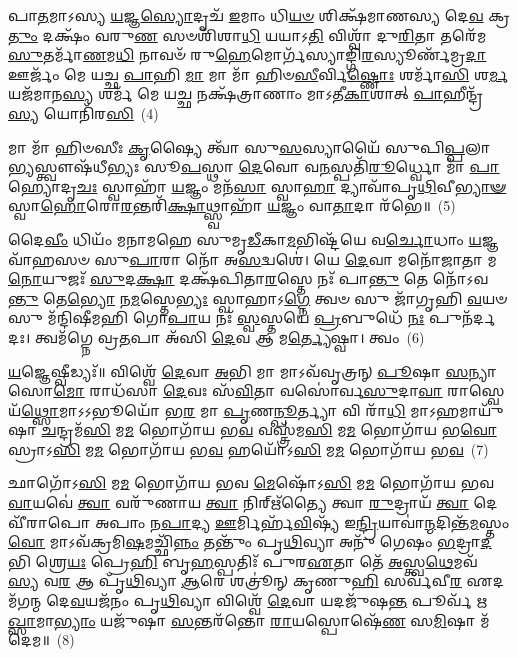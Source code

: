 𑌪𑌾\-\ul{𑌤}\-𑌮𑌾\-𑌽𑌸𑍍𑌯 \ul{𑌯}\-𑌜𑍍𑌞\-\ul{𑌸𑍍𑌯𑍋}\-𑌦𑍃𑌚᳴ \ul{𑌇}\-𑌮𑌾𑌂 𑌧𑌿\-\ul{𑌯}\-\-\ul{𑍞} 𑌶𑌿𑌕𑍍𑌷᳴𑌮𑌾𑌣𑌸𑍍𑌯 𑌦𑍇\-\ul{𑌵} 𑌕𑍍𑌰\-\ul{𑌤𑍁𑌂} 𑌦𑌕𑍍𑌷𑌂᳴ 𑌵𑌰𑍁\-\ul{𑌣} 𑌸𑍞𑌶𑌿᳴𑌶𑌾\-\ul{𑌧𑌿} 𑌯𑌯𑌾\-𑌽\-\ul{𑌤𑌿} 𑌵𑌿𑌶𑍍𑌵𑌾᳴ 𑌦𑍁\-\ul{𑌰𑌿}\-𑌤𑌾 𑌤𑌰𑍇᳴𑌮 \ul{𑌸𑍁}\-𑌤𑌰𑍍𑌮𑌾᳴\-\ul{𑌣}\-𑌮\-\ul{𑌧𑌿} 𑌨𑌾𑌵𑍞᳴ 𑌰𑍁\-\ul{𑌹𑍇}\-𑌮𑍋𑌰𑍍𑌗᳴𑌸𑍍𑌯𑌾𑌙𑍍𑌗𑌿\-\ul{𑌰}\-𑌸𑍍𑌯𑍂𑌰𑍍𑌣᳴𑌮𑍍𑌰\-\ul{𑌦𑌾} 𑌊𑌰𑍍𑌜𑌂᳴ 𑌮𑍇 𑌯𑌚𑍍𑌛 \ul{𑌪𑌾}\-𑌹𑌿 \ul{𑌮𑌾} 𑌮𑌾 𑌮𑌾᳴ 𑌹𑌿𑍞\-\ul{𑌸𑍀}\-𑌰𑍍𑌵𑌿\-\ul{𑌷𑍍𑌣𑍋𑌃} 𑌶𑌰𑍍𑌮𑌾᳴\-\ul{𑌸𑌿} 𑌶\-\ul{𑌰𑍍𑌮} 𑌯𑌜᳴𑌮𑌾𑌨\-\ul{𑌸𑍍𑌯} 𑌶𑌰𑍍𑌮᳴ 𑌮𑍇 𑌯\-\ul{𑌚𑍍𑌛} 𑌨𑌕𑍍𑌷᳴𑌤𑍍𑌰𑌾𑌣𑌾𑌂 𑌮𑌾\-𑌽𑌤𑍀\-\ul{𑌕𑌾}\-𑌶𑌾𑌤𑍍 \ul{𑌪𑌾}\-𑌹𑍀𑌨𑍍𑌦𑍍𑌰᳴\-\ul{𑌸𑍍𑌯} 𑌯𑍋𑌨𑌿᳴𑌰\-\ul{𑌸𑌿}\-~(4)

𑌮𑌾 𑌮𑌾᳴ 𑌹𑌿𑍞𑌸𑍀𑌃 \ul{𑌕𑍃}\-𑌷𑍍𑌯𑍈 𑌤𑍍𑌵𑌾᳴ 𑌸𑍁\-\ul{𑌸}\-𑌸𑍍𑌯𑌾𑌯𑍈᳴ 𑌸𑍁𑌪𑌿\-\ul{𑌪𑍍𑌪}\-𑌲𑌾\-\ul{𑌭𑍍𑌯}\-𑌸𑍍𑌤𑍍𑌵𑍗𑌷᳴\-𑌧𑍀𑌭𑍍𑌯𑌃 𑌸𑍂\-\ul{𑌪}\-𑌸𑍍𑌥𑌾 \ul{𑌦𑍇}\-𑌵𑍋 𑌵\-\ul{𑌨}\-𑌸𑍍𑌪𑌤𑌿᳴\-\ul{𑌰𑍂}\-𑌰𑍍𑌧𑍍𑌵𑍋 𑌮𑌾᳴ \ul{𑌪𑌾}\-𑌹𑍍𑌯𑍋𑌦𑍃\-\ul{𑌚𑌃} 𑌸𑍍𑌵𑌾𑌹𑌾᳴ \ul{𑌯}\-𑌜𑍍𑌞𑌂 𑌮𑌨᳴\-\ul{𑌸𑌾} 𑌸𑍍𑌵𑌾\-\ul{𑌹𑌾} 𑌦𑍍𑌯𑌾𑌵𑌾᳴𑌪𑍃\-\ul{𑌥𑌿}\-𑌵𑍀\-\ul{𑌭𑍍𑌯𑌾}\-\-\ul{𑍟} 𑌸𑍍𑌵𑌾\-\ul{𑌹𑍋}\-𑌰𑍋\-\ul{𑌰}\-𑌨𑍍𑌤𑌰𑌿᳴\-\ul{𑌕𑍍𑌷𑌾}\-𑌥𑍍𑌸𑍍𑌵𑌾𑌹𑌾᳴ \ul{𑌯}\-𑌜𑍍𑌞𑌂 𑌵𑌾\-\ul{𑌤𑌾}\-𑌦𑌾 𑌰᳴𑌭𑍇॥~(5)

{\anuvakamend[{\-\ul{𑌮𑌾} 𑌯𑍋𑌨𑌿᳴𑌰𑌸𑌿 \ul{𑌤𑍍𑌰𑌿}\-\-\ul{𑍞}\-𑌶𑌚𑍍𑌚᳴}]}%

𑌦𑍈\-\ul{𑌵𑍀𑌂} 𑌧𑌿𑌯𑌂᳴ 𑌮𑌨𑌾𑌮𑌹𑍇 𑌸𑍁𑌮𑍃\-\ul{𑌡𑍀}\-𑌕𑌾\-\ul{𑌮}\-𑌭𑌿𑌷𑍍𑌟᳴𑌯𑍇 𑌵\-\ul{𑌰𑍍𑌚𑍋}\-𑌧𑌾𑌂 \ul{𑌯}\-𑌜𑍍𑌞𑌵𑌾᳴𑌹𑌸𑍞 𑌸𑍁\-\ul{𑌪𑌾}\-𑌰𑌾 𑌨𑍋᳴ 𑌅\-\ul{𑌸}\-𑌦𑍍𑌵𑌶𑍇॑। 𑌯𑍇 \ul{𑌦𑍇}\-𑌵𑌾 𑌮𑌨𑍋᳴𑌜𑌾𑌤𑌾 𑌮\-\ul{𑌨𑍋}\-𑌯𑍁𑌜𑌃᳴ \ul{𑌸𑍁}\-𑌦\-\ul{𑌕𑍍𑌷𑌾} 𑌦𑌕𑍍𑌷᳴𑌪𑌿𑌤𑌾\-\ul{𑌰}\-𑌸𑍍𑌤𑍇 𑌨𑌃᳴ 𑌪𑌾\-\ul{𑌨𑍍𑌤𑍁} 𑌤𑍇 𑌨𑍋᳴\-𑌽𑌵\-\ul{𑌨𑍍𑌤𑍁} 𑌤𑍇\-\ul{𑌭𑍍𑌯𑍋} 𑌨\-\ul{𑌮}\-𑌸𑍍𑌤𑍇\-\ul{𑌭𑍍𑌯𑌃} 𑌸𑍍𑌵𑌾𑌹𑌾\-𑌽\-\ul{𑌗𑍍𑌨𑍇} 𑌤𑍍𑌵𑍞 𑌸𑍁 𑌜𑌾᳴𑌗𑍃𑌹𑌿 \ul{𑌵}\-𑌯𑍞 𑌸𑍁 𑌮᳴𑌨𑍍𑌦𑌿𑌷𑍀𑌮𑌹𑌿 𑌗𑍋\-\ul{𑌪𑌾}\-𑌯 𑌨𑌃᳴ \ul{𑌸𑍍𑌵}\-𑌸𑍍𑌤𑌯𑍇॑ \ul{𑌪𑍍𑌰}\-𑌬𑍁𑌧𑍇᳴ \ul{𑌨𑌃} 𑌪𑍁𑌨᳴𑌰𑍍𑌦𑌦𑌃। 𑌤𑍍𑌵𑌮᳴𑌗𑍍𑌨𑍇 𑌵𑍍𑌰\-\ul{𑌤}\-𑌪𑌾 𑌅᳴𑌸𑌿 \ul{𑌦𑍇}\-𑌵 𑌆 𑌮\-\ul{𑌰𑍍𑌤𑍍𑌯𑍇}\-𑌷𑍍𑌵𑌾। 𑌤𑍍𑌵𑌂~(6)

\-\ul{𑌯}\-𑌜𑍍𑌞𑍇𑌷𑍍𑌵𑍀𑌡𑍍𑌯𑌃᳴॥ 𑌵𑌿𑌶𑍍𑌵𑍇᳴ \ul{𑌦𑍇}\-𑌵𑌾 \ul{𑌅}\-𑌭𑌿 𑌮𑌾 𑌮𑌾\-𑌽𑌵᳴𑌵𑍃𑌤𑍍𑌰𑌨𑍍 \ul{𑌪𑍂}\-𑌷𑌾 \ul{𑌸}\-𑌨𑍍𑌯𑌾 𑌸𑍋\-\ul{𑌮𑍋} 𑌰𑌾𑌧᳴𑌸𑌾 \ul{𑌦𑍇}\-𑌵𑌃 𑌸᳴\-\ul{𑌵𑌿}\-𑌤𑌾 𑌵𑌸𑍋॑𑌰𑍍𑌵\-\ul{𑌸𑍁}\-𑌦𑌾\-\ul{𑌵𑌾} 𑌰𑌾𑌸𑍍𑌵𑍇𑌯᳴\-\ul{𑌥𑍍𑌸𑍋}\-𑌮𑌾\-𑌽\-𑌽𑌭𑍂𑌯𑍋᳴ 𑌭\-\ul{𑌰} 𑌮𑌾 \ul{𑌪𑍃}\-𑌣\-\ul{𑌨𑍍𑌪𑍂}\-𑌰𑍍𑌤𑍍𑌯𑌾 𑌵𑌿 𑌰𑌾᳴\-\ul{𑌧𑌿} 𑌮𑌾\-𑌽𑌹𑌮𑌾𑌯𑍁᳴𑌷𑌾 \ul{𑌚}\-𑌨𑍍𑌦𑍍𑌰𑌮᳴\-\ul{𑌸𑌿} 𑌮\-\ul{𑌮} 𑌭𑍋𑌗𑌾᳴𑌯 𑌭\-\ul{𑌵} 𑌵𑌸𑍍𑌤𑍍𑌰᳴𑌮\-\ul{𑌸𑌿} 𑌮\-\ul{𑌮} 𑌭𑍋𑌗𑌾᳴𑌯 𑌭\-\ul{𑌵𑍋}\-𑌸𑍍𑌰𑌾\-𑌽\-\ul{𑌸𑌿} 𑌮\-\ul{𑌮} 𑌭𑍋𑌗𑌾᳴𑌯 𑌭\-\ul{𑌵} 𑌹𑌯𑍋᳴\-𑌽\-\ul{𑌸𑌿} 𑌮\-\ul{𑌮} 𑌭𑍋𑌗𑌾᳴𑌯 𑌭\-\ul{𑌵}\-~(7)

𑌛𑌾𑌗𑍋᳴\-𑌽\-\ul{𑌸𑌿} 𑌮\-\ul{𑌮} 𑌭𑍋𑌗𑌾᳴𑌯 𑌭𑌵 \ul{𑌮𑍇}\-𑌷𑍋᳴\-𑌽\-\ul{𑌸𑌿} 𑌮\-\ul{𑌮} 𑌭𑍋𑌗𑌾᳴𑌯 𑌭𑌵 \ul{𑌵𑌾}\-𑌯𑌵𑍇॑ \ul{𑌤𑍍𑌵𑌾} 𑌵𑌰𑍁᳴𑌣𑌾𑌯 \ul{𑌤𑍍𑌵𑌾} 𑌨𑌿𑌰𑍍\mbox{}𑌋᳴𑌤𑍍𑌯𑍈 𑌤𑍍𑌵𑌾 \ul{𑌰𑍁}\-𑌦𑍍𑌰𑌾𑌯᳴ \ul{𑌤𑍍𑌵𑌾} 𑌦𑍇𑌵𑍀᳴𑌰𑌾𑌪𑍋 𑌅𑌪𑌾𑌂 𑌨\-\ul{𑌪𑌾}\-𑌦𑍍𑌯 \ul{𑌊}\-𑌰𑍍𑌮𑌿𑌰𑍍\mbox{}𑌹᳴\-\ul{𑌵𑌿}\-𑌷𑍍𑌯᳴ 𑌇\-\ul{𑌨𑍍𑌦𑍍𑌰𑌿}\-𑌯𑌾𑌵𑌾॑\-\ul{𑌨𑍍𑌮}\-𑌦𑌿𑌨𑍍𑌤᳴\-\ul{𑌮}\-𑌸𑍍𑌤𑌂 \ul{𑌵𑍋} 𑌮𑌾\-𑌽𑌵᳴𑌕𑍍𑌰𑌮𑌿\-\ul{𑌷}\-𑌮𑌚𑍍𑌛𑌿᳴\-\ul{𑌨𑍍𑌨𑌂} 𑌤𑌨𑍍𑌤𑍁𑌂᳴ 𑌪𑍃\-\ul{𑌥𑌿}\-𑌵𑍍𑌯𑌾 𑌅𑌨𑍁᳴ 𑌗𑍇𑌷𑌂 \ul{𑌭}\-𑌦𑍍𑌰𑌾\-\ul{𑌦}\-𑌭𑌿 𑌶𑍍𑌰𑍇\-\ul{𑌯𑌃} 𑌪𑍍𑌰𑍇\-\ul{𑌹𑌿} 𑌬𑍃\-\ul{𑌹}\-𑌸𑍍𑌪𑌤𑌿𑌃᳴ 𑌪𑍁𑌰\-\ul{𑌏}\-𑌤𑌾 𑌤𑍇᳴ \ul{𑌅}\-𑌸𑍍𑌤𑍍𑌵\-\ul{𑌥𑍇}\-𑌮𑌵᳴ \ul{𑌸𑍍𑌯} 𑌵\-\ul{𑌰} 𑌆 𑌪𑍃᳴\-\ul{𑌥𑌿}\-𑌵𑍍𑌯𑌾 \ul{𑌆}\-𑌰𑍇 𑌶𑌤𑍍𑌰𑍂॑𑌨𑍍 𑌕𑍃𑌣𑍁\-\ul{𑌹𑌿} 𑌸𑌰𑍍𑌵᳴𑌵𑍀\-\ul{𑌰} 𑌏𑌦𑌮᳴𑌗𑌨𑍍𑌮 𑌦𑍇\-\ul{𑌵}\-𑌯𑌜᳴𑌨𑌂 𑌪𑍃\-\ul{𑌥𑌿}\-𑌵𑍍𑌯𑌾 𑌵𑌿𑌶𑍍𑌵𑍇᳴ \ul{𑌦𑍇}\-𑌵𑌾 𑌯𑌦𑌜𑍁᳴𑌷\-\ul{𑌨𑍍𑌤} 𑌪𑍂𑌰𑍍𑌵᳴ 𑌋\-\ul{𑌖𑍍𑌸𑌾}\-𑌮𑌾\-\ul{𑌭𑍍𑌯𑌾𑌂} 𑌯𑌜𑍁᳴𑌷𑌾 \ul{𑌸}\-𑌨𑍍𑌤𑌰᳴𑌨𑍍𑌤𑍋 \ul{𑌰𑌾}\-𑌯𑌸𑍍𑌪𑍋𑌷𑍇᳴\-\ul{𑌣} 𑌸\-\ul{𑌮𑌿}\-𑌷𑌾 𑌮᳴𑌦𑍇𑌮॥~(8)

